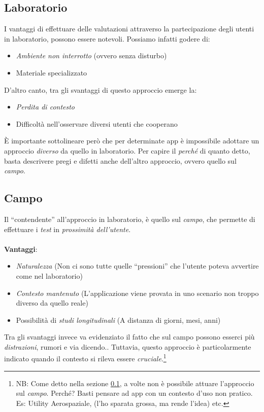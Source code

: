 \documentclass[oneside]{book}
\begin{document}
		\subsection{Laboratorio} \label{sec:laboratoriocampo}
			I vantaggi di effettuare delle valutazioni attraverso la partecipazione degli utenti in laboratorio, possono essere notevoli. Possiamo infatti godere di:
			\begin{itemize}
			\item \emph{Ambiente non interrotto} (ovvero senza disturbo)
			\item Materiale specializzato 
			\end{itemize}
			D'altro canto, tra gli svantaggi di questo approccio emerge la:
			\begin{itemize}
			\item \emph{Perdita di contesto}
			\item Difficoltà nell'osservare diversi utenti che cooperano
			\end{itemize}
			È importante sottolineare però che per determinate app è impossibile adottare un approccio \emph{diverso} da quello in laboratorio. Per capire il \emph{perché} di quanto detto, basta descrivere pregi e difetti anche dell'altro approccio, ovvero quello sul \emph{campo}.

		\subsection{Campo}
			Il ``contendente'' all'approccio in laboratorio, è quello sul \emph{campo}, che permette di effettuare i \emph{test} in \emph{prossimità dell'utente}.\\ 
			\\ \textbf{Vantaggi}:
			\begin{itemize}
			\item \emph{Naturalezza} (Non ci sono tutte quelle ``pressioni'' che l'utente poteva avvertire come nel laboratorio)
			\item \emph{Contesto mantenuto} (L'applicazione viene provata in uno scenario non troppo diverso da quello reale)
			\item Possibilità di \emph{studi longitudinali} (A distanza di giorni, mesi, anni)
			\end{itemize}
			Tra gli svantaggi invece va evidenziato il fatto che sul campo possono esserci più \emph{distrazioni}, rumori e via dicendo.. Tuttavia, questo approccio è particolarmente indicato quando il contesto si rileva essere \emph{cruciale}.\footnote{NB: Come detto nella sezione \ref{sec:laboratoriocampo}, a volte non è possibile attuare l'approccio sul \emph{campo}. Perché? Basti pensare ad app con un contesto d'uso non pratico. Es: Utility Aerospaziale, (l'ho sparata grossa, ma rende l'idea) etc.}
\end{document}
